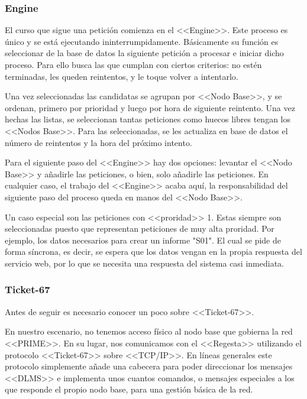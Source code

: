 \subsubsection{Engine}

El curso que sigue una petición comienza en el <<Engine>>. Este proceso es único y se está ejecutando ininterrumpidamente. Básicamente su función es seleccionar de la base de datos la siguiente petición a procesar e iniciar dicho proceso. Para ello busca las que cumplan con ciertos criterios: no estén terminadas, les queden reintentos, y le toque volver a intentarlo.

Una vez seleccionadas las candidatas se agrupan por <<Nodo Base>>, y se ordenan, primero por prioridad y luego por hora de siguiente reintento. Una vez hechas las listas, se seleccionan tantas peticiones como huecos libres tengan los <<Nodos Base>>. Para las seleccionadas, se les actualiza en base de datos el número de reintentos y la hora del próximo intento.

Para el siguiente paso del <<Engine>> hay dos opciones: levantar el <<Nodo Base>> y añadirle las peticiones, o bien, solo añadirle las peticiones. En cualquier caso, el trabajo del <<Engine>> acaba aquí, la responsabilidad del siguiente paso del proceso queda en manos del <<Nodo Base>>.

Un caso especial son las peticiones con <<proridad>> 1. Estas siempre son seleccionadas puesto que representan peticiones de muy alta proridad. Por ejemplo, los datos necesarios para crear un informe "S01". El cual se pide de forma síncrona, es decir, se espera que los datos vengan en la propia respuesta del servicio web, por lo que se necesita una respuesta del sistema casi inmediata.

\subsubsection{Ticket-67}\label{sec:ticket67}

Antes de seguir es necesario conocer un poco sobre <<Ticket-67>>.

En nuestro escenario, no tenemos acceso físico al nodo base que gobierna la red <<PRIME>>. En su lugar, nos comunicamos con el <<Regesta>> utilizando el protocolo <<Ticket-67>> sobre <<TCP/IP>>. En líneas generales este protocolo simplemente añade una cabecera para poder direccionar los mensajes <<DLMS>> e implementa unos cuantos comandos, o mensajes especiales a los que responde el propio nodo base, para una gestión básica de la red.

